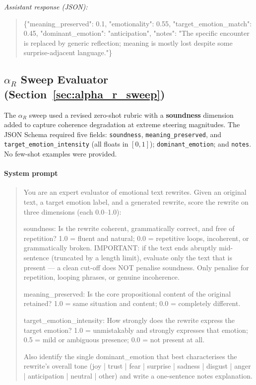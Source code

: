 \noindent\textit{Assistant response (JSON):}
\begin{quote}
\small\ttfamily
\{"meaning\_preserved": 0.1, "emotionality": 0.55, "target\_emotion\_match": 0.45,
"dominant\_emotion": "anticipation", "notes": "The specific encounter is replaced by
generic reflection; meaning is mostly lost despite some surprise-adjacent language."\}
\end{quote}

\subsection{\texorpdfstring{$\alpha_R$}{alphaR} Sweep Evaluator (Section~\ref{sec:alpha_r_sweep})}
\label{app:eval_prompt_ar}

The $\alpha_R$ sweep used a revised zero-shot rubric with a \textbf{soundness} dimension
added to capture coherence degradation at extreme steering magnitudes.
The JSON Schema required five fields: \texttt{soundness}, \texttt{meaning\_preserved}, and \texttt{target\_emotion\_intensity} (all floats in $[0,1]$); \texttt{dominant\_emotion}; and \texttt{notes}.
No few-shot examples were provided.

\paragraph{System prompt}
\begin{quote}
\small\ttfamily
You are an expert evaluator of emotional text rewrites.
Given an original text, a target emotion label, and a generated rewrite,
score the rewrite on three dimensions (each 0.0--1.0):
\par\medskip
\noindent soundness: Is the rewrite coherent, grammatically correct, and free of repetition?
1.0 = fluent and natural; 0.0 = repetitive loops, incoherent, or grammatically broken.
IMPORTANT: if the text ends abruptly mid-sentence (truncated by a length limit),
evaluate only the text that is present --- a clean cut-off does NOT penalise soundness.
Only penalise for repetition, looping phrases, or genuine incoherence.
\par
\noindent meaning\_preserved: Is the core propositional content of the original retained?
1.0 = same situation and content; 0.0 = completely different.
\par
\noindent target\_emotion\_intensity: How strongly does the rewrite express the target emotion?
1.0 = unmistakably and strongly expresses that emotion;
0.5 = mild or ambiguous presence; 0.0 = not present at all.
\par\medskip
\noindent Also identify the single dominant\_emotion that best characterises the rewrite's
overall tone (joy | trust | fear | surprise | sadness | disgust | anger | anticipation |
neutral | other) and write a one-sentence notes explanation.
\end{quote}

